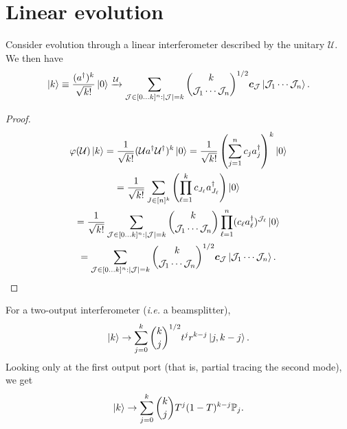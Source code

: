\documentclass[12pt]{report}
\newcommand{\PP}{\mathbb{P}}
\newcommand{\bs}[1]{\boldsymbol{#1}}
\newcommand{\calJ}{{\mathcal{J}}}
\newcommand{\calU}{{\mathcal{U}}}
\begin{document}
\section{Linear evolution}

\begin{prop}
	Consider evolution through a linear interferometer described by the unitary $\calU$. We then have
	\begin{equation}
		\ket k \equiv \frac{(a^\dagger)^k}{\sqrt{k!}} \ket 0
		\xrightarrow{\calU} \sum_{\calJ\in[0...k]^n : |\calJ|=k}
		\binom{k}{\calJ_1\cdots \calJ_n}^{1/2}
		\bs c_{\calJ}
		\ket{\calJ_1\cdots \calJ_n}.
	\end{equation}
\end{prop}

\begin{proof}
	\begin{equation}
	\begin{gathered}
		\varphi(\calU) \ket k
		= \frac{1}{\sqrt{k!}}(\calU a^\dagger \calU^\dagger)^k \ket0
		= \frac{1}{\sqrt{k!}}
		\left(
			\sum_{j=1}^n c_j a_j^\dagger
		\right)^k \ket 0 \\
		= \frac{1}{\sqrt{k!}}
		\sum_{J\in [n]^k} \left(\prod_{\ell=1}^k c_{J_\ell} a_{J_\ell}^\dagger\right) \ket0 \\
		= \frac{1}{\sqrt{k!}}
		\sum_{\calJ\in[0...k]^n : |\calJ|=k}
		\binom{k}{\calJ_1\cdots \calJ_n}
		\prod_{\ell=1}^n (c_\ell a_{\ell}^\dagger)^{\calJ_\ell} \ket0 \\
		= \sum_{\calJ\in[0...k]^n : |\calJ|=k}
		\binom{k}{\calJ_1\cdots \calJ_n}^{1/2}
		\bs c_\calJ \ket{\calJ_1\cdots \calJ_n}.
	\end{gathered}
	\end{equation}
\end{proof}

\begin{example}
	For a two-output interferometer (\emph{i.e.} a beamsplitter),
	\begin{equation}
		\ket k \to
		\sum_{j=0}^k \binom{k}{j}^{1/2} t^j r^{k-j} \ket{j,k-j}.
	\end{equation}
	Looking only at the first output port (that is, partial tracing the second mode), we get
	\begin{equation}
		\ket k \to
		\sum_{j=0}^k \binom{k}{j} T^j (1-T)^{k-j} \PP_j.
	\end{equation}
\end{example}
\end{document}
